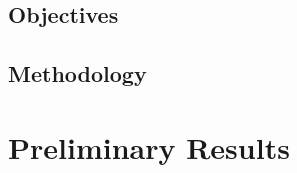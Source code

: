 \documentclass[a4paper,12pt]{article}
\begin{document}
\subsection{Objectives}
    \label{sec_objectives}

\subsection{Methodology}
    \label{sec_methodology}

\clearpage

\section{Preliminary Results}
\clearpage


\end{document}
